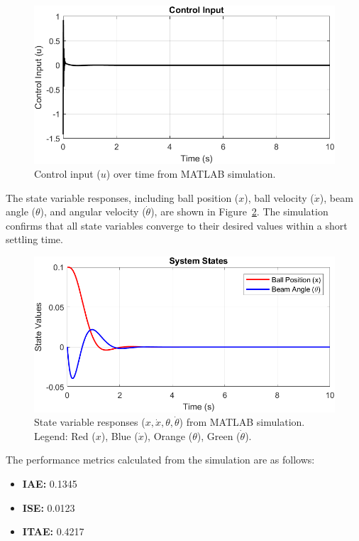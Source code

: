 \documentclass[conference]{IEEEtran}
\begin{document}
\begin{figure}[H]
    \centering
    \includegraphics[width=\linewidth]{figures/control_input_sim.png}
    \caption[]{Control input (\(u\)) over time from MATLAB simulation.}
    \label{fig:matlab_control}
\end{figure}

The state variable responses, including ball position (\(x\)), ball velocity (\(\dot{x}\)), beam angle (\(\theta\)), and angular velocity (\(\dot{\theta}\)), are shown in Figure~\ref{fig:matlab_states}. The simulation confirms that all state variables converge to their desired values within a short settling time.

\begin{figure}[H]
    \centering
    \includegraphics[width=\linewidth]{figures/state_sim.png}
    \caption[]{State variable responses (\(x, \dot{x}, \theta, \dot{\theta}\)) from MATLAB simulation. Legend: Red (\(x\)), Blue (\(\dot{x}\)), Orange (\(\theta\)), Green (\(\dot{\theta}\)).}
    \label{fig:matlab_states}
\end{figure}

The performance metrics calculated from the simulation are as follows:
\begin{itemize}
    \item \textbf{IAE:} 0.1345
    \item \textbf{ISE:} 0.0123
    \item \textbf{ITAE:} 0.4217
\end{itemize}
\end{document}
